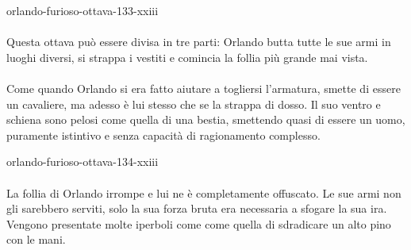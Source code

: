 \documentclass[preview]{standalone}
\begin{document}
\begin{snippet}{orlando-furioso-ottava-133-xxiii}
    \\\\
    Questa ottava può essere divisa in tre parti:
    Orlando butta tutte le sue armi in luoghi diversi, si strappa i vestiti
    e comincia la follia più grande mai vista.
    \\\\
    Come quando Orlando si era fatto aiutare a togliersi l'armatura, smette di essere un cavaliere,
    ma adesso è lui stesso che se la strappa di dosso.
    Il suo ventro e schiena sono pelosi come quella di una bestia,
    smettendo quasi di essere un uomo, puramente istintivo e senza capacità di ragionamento complesso.
\end{snippet}

\begin{snippet}{orlando-furioso-ottava-134-xxiii}
    \\\\
    La follia di Orlando irrompe e lui ne è completamente offuscato.
    Le sue armi non gli sarebbero serviti, solo la sua forza bruta era necessaria a sfogare la sua ira.
    Vengono presentate molte iperboli come come quella di sdradicare un alto pino con le mani.
\end{snippet}
\end{document}
